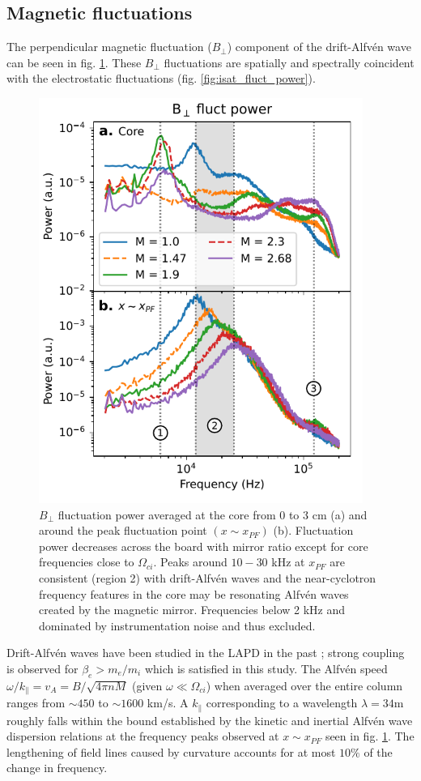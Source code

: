 \subsection{Magnetic fluctuations}
The perpendicular magnetic fluctuation ($B_\perp$) component of the drift-Alfvén wave can be seen in fig. \ref{fig:bperp_fluct}. These $B_\perp$ fluctuations are spatially and spectrally coincident with the electrostatic fluctuations (fig. \ref{fig:isat_fluct_power}).
\begin{figure}
    \centering
    \includegraphics[width=300pt]{figures/fig13.pdf}
    \caption{$B_\perp$ fluctuation power averaged at the core from 0 to 3 cm (a) and around the peak fluctuation point $(x \sim x_{PF})$ (b). Fluctuation power decreases across the board with mirror ratio except for core frequencies close to $\Omega_{ci}$. Peaks around $10-30$ kHz at $x_{PF}$ are consistent (region 2) with drift-Alfvén waves and the near-cyclotron frequency features in the core may be resonating Alfvén waves created by the magnetic mirror. Frequencies below 2 kHz and dominated by instrumentation noise and thus excluded.}
    \label{fig:bperp_fluct}
\end{figure}
Drift-Alfvén waves have been studied in the LAPD in the past \cite{Maggs_1997, Vincena_2006}; strong coupling is observed for $\beta_e > m_e / m_i$ which is satisfied in this study. The Alfvén speed $\omega / k_\parallel = v_A = B/\sqrt{4 \pi n M}$ (given $\omega \ll \Omega_{ci}$) when averaged over the entire column ranges from $\sim 450$ to $\sim 1600$ km/s. A $k_\parallel$ corresponding to a wavelength $\lambda = 34$m roughly falls within the bound established by the kinetic and inertial Alfvén wave dispersion relations at the frequency peaks observed at $x \sim x_{PF}$ seen in fig. \ref{fig:bperp_fluct}. The lengthening of field lines caused by curvature accounts for at most $10\%$ of the change in frequency.

